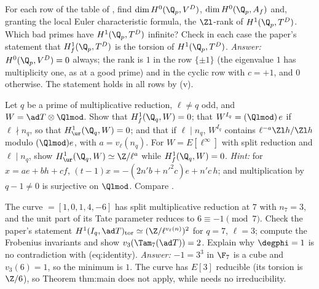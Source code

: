\begin{exercise}\label{ex:blochkato:ex-local-ranks}
\sloppy For each row of the table of , find $\dim H^0(\Q_p,V^D)$, $\dim H^0(\Q_p,A_f)$ and, granting the local Euler characteristic formula, the
$\Zl$-rank of $H^1(\Q_p,T^D)$. Which bad primes have $H^1(\Q_p,T^D)$ infinite? Check in each case the paper's statement that $H^1_f(\Q_p,T^D)$ is the torsion of $H^1(\Q_p,T^D)$.
\emph{Answer:} $H^0(\Q_p,V^D)=0$ always; the rank is $1$ in the row $\{\pm1\}$ (the eigenvalue $1$ has multiplicity one, as at a good prime) and in the cyclic row with $c=+1$, and
$0$ otherwise. The statement holds in all rows by (v).
\end{exercise}

\begin{exercise}\label{ex:blochkato:ex-mult}
Let $q$ be a prime of multiplicative reduction, $\ell\ne q$ odd, and $W=\ad T\otimes\Qlmod$. Show that $H^1_f(\Q_q,W)=0$; that $W^{I_q}=(\Qlmod)\,e$ if $\ell\nmid n_q$, so that
$H^1_{\ur}(\Q_q,W)=0$; and that if $\ell\mid n_q$, $W^{I_q}$ contains $\ell^{-a}\Zl h/\Zl h$ modulo $(\Qlmod)e$, with $a=v_\ell(n_q)$. For $W=E[\ell^\infty]$ with split reduction and $\ell\mid n_q$, show
$H^1_{\ur}(\Q_q,W)\simeq\Z/\ell^{a}$ while $H^1_f(\Q_q,W)=0$.
\emph{Hint:} for $x=ae+bh+cf$, $(t-1)x=-(2n'b+n'^2c)e+n'c\,h$; and multiplication by $q-1\ne0$ is surjective on $\Qlmod$. Compare .
\end{exercise}

\begin{exercise}\label{ex:blochkato:ex-14a1}
The curve  $=[1,0,1,4,-6]$ has split multiplicative reduction at $7$ with $n_7=3$, and the unit part of its Tate parameter reduces to $6\equiv-1\pmod7$. Check the
paper's statement $H^1(I_q,\ad T)_{\mathrm{tor}}\simeq(\Z/\ell^{v_\ell(n)})^2$ for $q=7$, $\ell=3$; compute the Frobenius invariants and show $v_3(\Tam_7(\ad T))=2$. Explain why $\degphi=1$ is no
contradiction with (eq:identity).
\emph{Answer:} $-1=3^3$ in $\F_7$ is a cube and $v_3(6)=1$, so the minimum is $1$. The curve has $E[3]$ reducible (its torsion is $\Z/6$), so Theorem thm:main does not apply,
while  needs no irreducibility.
\end{exercise}

